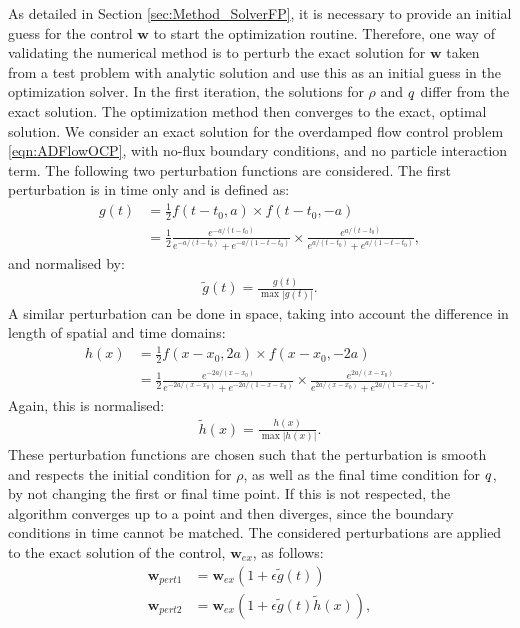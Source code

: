 
As detailed in Section \ref{sec:Method_SolverFP}, it is necessary to provide an initial guess for the control $\mathbf{w}$ to start the optimization routine. Therefore, one way of validating the numerical method is to perturb the exact solution for $\mathbf{w}$ taken from a test problem with analytic solution and use this as an initial guess in the optimization solver. In the first iteration, the solutions for $\rho$ and $q$ differ from the exact solution. The optimization method then converges to the exact, optimal solution. We consider an exact solution for the overdamped flow control problem \eqref{eqn:ADFlowOCP}, with no-flux boundary conditions, and no particle interaction term. 
The following two perturbation functions are considered. The first perturbation is in time only and is defined as:
\begin{align*}
g(t) &= \frac{1}{2} f(t-t_0, a) \times f(t-t_0, -a)\\
&= \frac{1}{2} \frac{e^{-a/(t-t_0)}}{e^{-a/(t-t_0)} + e^{-a/(1-t -t_0)}} \times \frac{e^{a/(t-t_0)}}{e^{a/(t-t_0)} + e^{a/(1-t - t_0)}},
\end{align*}
and normalised by:
\begin{align*}
\tilde g(t) = \frac{g(t)}{\max{|{g(t)}|}}.
\end{align*}
A similar perturbation can be done in space, taking into account the difference in length of spatial and time domains:
\begin{align*}
h(x) &= \frac{1}{2} f(x-x_0, 2a) \times f(x-x_0, -2a)\\
&= \frac{1}{2} \frac{e^{-2a/(x-x_0)}}{e^{-2a/(x-x_0)} + e^{-2a/(1-x-x_0)}} \times \frac{e^{2a/(x-x_0)}}{e^{2a/(x-x_0)} + e^{2a/(1-x-x_0)}}.
\end{align*}
Again, this is normalised:
\begin{align*}
\tilde h(x) = \frac{h(x)}{\max{|{h(x)}|}}.
\end{align*}
These perturbation functions are chosen such that the perturbation is smooth and respects the initial condition for $\rho$, as well as the final time condition for $q$, by not changing the first or final time point. If this is not respected, the algorithm converges up to a point and then diverges, since the boundary conditions in time cannot be matched.
The considered perturbations are applied to the exact solution of the control, $\mathbf{w}_{ex}$, as follows:
\begin{align*}
\mathbf{w}_{pert1} &= \mathbf{w}_{ex}(1+ \epsilon \tilde g(t))\\
\mathbf{w}_{pert2} &= \mathbf{w}_{ex}(1+ \epsilon \tilde g(t) \tilde h(x)),
\end{align*}
